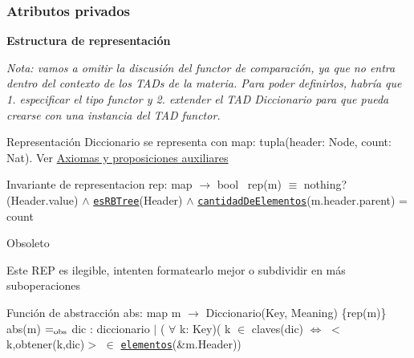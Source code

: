 \subsubsection*{Atributos privados}
\begin{Indent}{\bf Estructura de representación}\par
{\em Nota\+: vamos a omitir la discusión del functor de comparación, ya que no entra dentro del contexto de los T\+A\+Ds de la materia. Para poder definirlos, habría que 1. especificar el tipo functor y 2. extender el T\+AD Diccionario para que pueda crearse con una instancia del T\+AD functor.

\begin{DoxyParagraph}{Representación}
Diccionario se representa con map\+: tupla(header\+: Node, count\+: Nat). Ver \hyperlink{axiomas}{Axiomas y proposiciones auxiliares}
\end{DoxyParagraph}
\begin{DoxyParagraph}{Invariante de representacion}
rep\+: map $\to$ bool~\newline
rep(m) $\equiv$ nothing?(Header.\+value) $\land$ \href{axiomas.html#esRBTree}{\tt es\+R\+B\+Tree}(Header) $\land$ \href{axiomas.html#cantidadDeElementos}{\tt cantidad\+De\+Elementos}(m.\+header.\+parent) = count 
\end{DoxyParagraph}


\begin{DoxyRefDesc}{Obsoleto}
\item[\hyperlink{deprecated__deprecated000020}{Obsoleto}]Este R\+EP es ilegible, intenten formatearlo mejor o subdividir en más suboperaciones\end{DoxyRefDesc}


\begin{DoxyParagraph}{Función de abstracción}
abs\+: map m $\to$ Diccionario(Key, Meaning) \{rep(m)\}~\newline
abs(m) $=_{\rm obs}$ dic \+: diccionario $\vert$ ( $\forall$ k\+: Key)( k $\in$ claves(dic) $\Leftrightarrow$ $<$k,obtener(k,dic)$>$ $\in$ \href{axiomas.html#elementos}{\tt elementos}(\&m.\+Header)) 
\end{DoxyParagraph}


}
\end{Indent}
